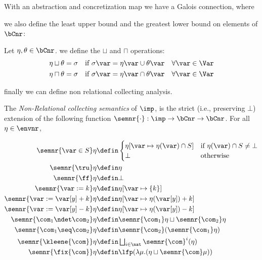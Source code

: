 With an abstraction and concretization map we have a Galois
connection, where 

we also define the least upper bound and the greatest lower bound on
elements of \(\bCnr\):

\begin{definition}
  Let \(\eta,\theta \in \bCnr\). we define the \(\sqcup\) and
  \(\sqcap\) operations:
  \begin{align*}
    \eta \sqcup \theta & = \sigma & \text{if } \sigma\var = \eta\var \cup \theta\var \quad \forall \var \in \Var \\
    \eta \sqcap \theta & = \sigma & \text{if } \sigma\var = \eta\var \cap \theta\var \quad \forall \var \in \Var \\
  \end{align*}
\end{definition}

finally we can define non relational collecting analysis.

\begin{definition}\label{def:nonrel}
  The \emph{Non-Relational collecting semantics} of \(\imp\), is the
  strict (i.e., preserving \(\bot\))
  extension of the following function \(\semnr{\cdot}: \imp \to
  \bCnr \to \bCnr\). For all \(\eta \in \envnr\),

  \begin{align*}
    \semnr{\var \in S}\eta 
    & \defin  
      \begin{cases}
        \eta[\var \mapsto \eta(\var)\cap S] & \text{if }\eta(\var)\cap S\neq \bot \\ \bot & \text{otherwise}
      \end{cases}\\
    \semnr{\tru}\eta 
    & \defin \eta\\
    \semnr{\ff}\eta 
    & \defin \bot\\
    \semnr{\var := k}\eta 
    & \defin \eta[\var \mapsto \{k\}]\\
    \semnr{\var := \var[y] + k}\eta 
    & \defin \eta[\var \mapsto \eta (\var[y]) + k]\\
    \semnr{\var := \var[y] - k}\eta 
    & \defin \eta[\var \mapsto \eta (\var[y]) - k]\\
    \semnr{\com_1 \ndet \com_2} \eta
    & \defin \semnr{\com_1} \eta \sqcup \semnr{\com_2} \eta\\
    \semnr{\com_1 \seq \com_2} \eta
    & \defin \semnr{\com_2} (\semnr{\com_1} \eta)\\
    \semnr{\kleene{\com}} \eta
    & \defin \textstyle \bigsqcup_{i \in \nat} \semnr{\com}^i (\eta)\\
    \semnr{\fix{\com}} \eta
    & \defin  \lfp(\lambda \mu. (\eta \sqcup \semnr{\com} \mu))
  \end{align*}
\end{definition}